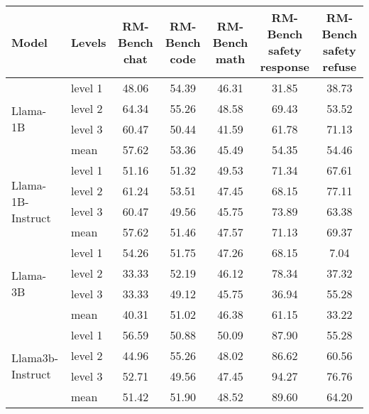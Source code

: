 \begin{table*}[h!]
\centering
\renewcommand{\arraystretch}{0.9}
\setlength{\tabcolsep}{3pt}

\begin{tabular}{l|l|c|c|c|c|c}
\hline
\rowcolor{apricot}
\textbf{Model} & \textbf{Levels} & 
\shortstack{\textbf{RM-Bench} \\ \textbf{chat}} & 
\shortstack{\textbf{RM-Bench} \\ \textbf{code}} & 
\shortstack{\textbf{RM-Bench} \\ \textbf{math}} & 
\shortstack{\textbf{RM-Bench} \\ \textbf{safety response}} & 
\shortstack{\textbf{RM-Bench} \\ \textbf{safety refuse}} \\
\hline
\hline
\multirow{4}{*}{Llama-1B} &  level 1 & 48.06 & 54.39 & 46.31 & 31.85 & 38.73 \\
& level 2 & 64.34 & 55.26 & 48.58 & 69.43 & 53.52 \\
& level 3 & 60.47 & 50.44 & 41.59 & 61.78 & 71.13 \\
& mean & 57.62 & 53.36 & 45.49 & 54.35 & 54.46 \\
\hline
\multirow{4}{*}{Llama-1B-Instruct} & level 1 & 51.16 & 51.32 & 49.53 & 71.34 & 67.61 \\
& level 2 & 61.24 & 53.51 & 47.45 & 68.15 & 77.11 \\
&  level 3 & 60.47 & 49.56 & 45.75 & 73.89 & 63.38 \\
& mean & 57.62 & 51.46 & 47.57 & 71.13 & 69.37 \\
\hline

\multirow{4}{*}{Llama-3B} & 
level 1 & 54.26 & 51.75 & 47.26 & 68.15 & 7.04 \\
& level 2 & 33.33 & 52.19 & 46.12 & 78.34 & 37.32 \\
& level 3 & 33.33 & 49.12 & 45.75 & 36.94 & 55.28 \\
& mean & 40.31 & 51.02 & 46.38 & 61.15 & 33.22 \\
\hline
 \multirow{4}{*}{Llama3b-Instruct} &  level 1 & 56.59 & 50.88 & 50.09 & 87.90 & 55.28 \\
& level 2 & 44.96 & 55.26 & 48.02 & 86.62 & 60.56 \\
&  level 3 & 52.71 & 49.56 & 47.45 & 94.27 & 76.76 \\
& mean & 51.42 & 51.90 & 48.52 & 89.60 & 64.20 \\
\hline



\end{tabular}
\end{table*}
